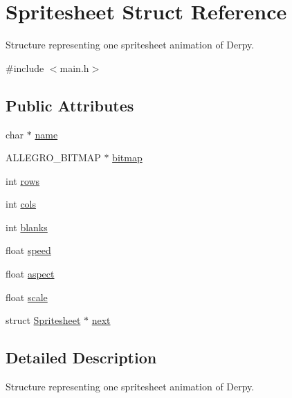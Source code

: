 \hypertarget{structSpritesheet}{\section{\-Spritesheet \-Struct \-Reference}
\label{structSpritesheet}
}


\-Structure representing one spritesheet animation of \-Derpy.  




{\ttfamily \#include $<$main.\-h$>$}

\subsection*{\-Public \-Attributes}
\begin{DoxyCompactItemize}
\item 
char $\ast$ \hyperlink{structSpritesheet_a6788d53f825bd74cda7e50e75435befa}{name}
\item 
\-A\-L\-L\-E\-G\-R\-O\-\_\-\-B\-I\-T\-M\-A\-P $\ast$ \hyperlink{structSpritesheet_ad31be6e59349586862e6a813ea139bcb}{bitmap}
\item 
int \hyperlink{structSpritesheet_aeab321ce6cdd45cc8a5078e80480510e}{rows}
\item 
int \hyperlink{structSpritesheet_a3d512755ce492a35e1816fe026cc37c9}{cols}
\item 
int \hyperlink{structSpritesheet_a5010b18959949b1c577078f94a810ef3}{blanks}
\item 
float \hyperlink{structSpritesheet_ad011770ca540de2bad85f0cb155c774b}{speed}
\item 
float \hyperlink{structSpritesheet_a85c93c8d80227725374e1581c4c8e049}{aspect}
\item 
float \hyperlink{structSpritesheet_ac46cf3d01609f66aae140e3b7d3d1109}{scale}
\item 
struct \hyperlink{structSpritesheet}{\-Spritesheet} $\ast$ \hyperlink{structSpritesheet_a671f77f759138aa2c852e5252b6daac5}{next}
\end{DoxyCompactItemize}


\subsection{\-Detailed \-Description}
\-Structure representing one spritesheet animation of \-Derpy. 

